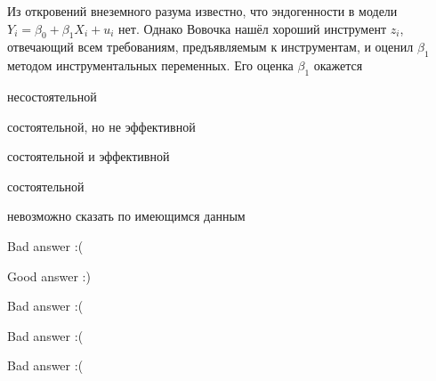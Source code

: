 
\begin{question}
Из откровений внеземного разума известно, что эндогенности в модели \(Y_i = \beta_0 + \beta_1 X_i + u_i\) нет. Однако Вовочка нашёл хороший инструмент \(z_i\), отвечающий всем требованиям, предъявляемым к инструментам, и оценил \(\beta_1\) методом инструментальных переменных. Его оценка \(\beta_1\) окажется
\begin{answerlist}
  \item несостоятельной
  \item состоятельной, но не эффективной
  \item состоятельной и эффективной
  \item состоятельной
  \item невозможно сказать по имеющимся данным
\end{answerlist}
\end{question}

\begin{solution}
\begin{answerlist}
  \item Bad answer :(
  \item Good answer :)
  \item Bad answer :(
  \item Bad answer :(
  \item Bad answer :(
\end{answerlist}
\end{solution}

